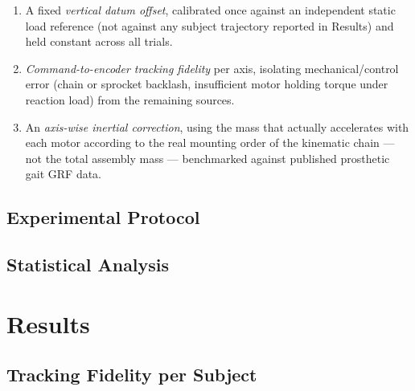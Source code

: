 \documentclass[bioengineering,article,submit,moreauthors]{Definitions/mdpi}
\begin{document}
\begin{enumerate}
\item A fixed \textit{vertical datum offset}, calibrated once against
an independent static load reference (not against any subject
trajectory reported in Results) and held constant across all trials.
\item \textit{Command-to-encoder tracking fidelity} per axis, isolating
mechanical/control error (chain or sprocket backlash, insufficient
motor holding torque under reaction load) from the remaining sources.
\item An \textit{axis-wise inertial correction}, using the mass that
actually accelerates with each motor according to the real mounting
order of the kinematic chain --- not the total assembly mass ---
benchmarked against published prosthetic gait GRF data.
\end{enumerate}

\subsection{Experimental Protocol}

\subsection{Statistical Analysis}

\section{Results}

\subsection{Tracking Fidelity per Subject}
\end{document}

